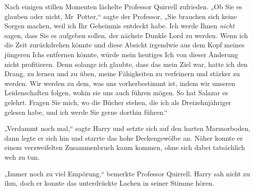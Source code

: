 Nach einigen stillen Momenten lächelte Professor Quirrell zufrieden. „Ob Sie es glauben oder nicht, Mr~Potter,“ sagte der Professor, „Sie brauchen sich keine Sorgen machen, weil ich Ihr Geheimnis entdeckt habe. Ich werde Ihnen \emph{nicht} sagen, dass Sie es aufgeben sollen, der nächste Dunkle Lord zu werden. Wenn ich die Zeit zurückdrehen könnte und diese Absicht irgendwie aus dem Kopf meines jüngeren Ichs entfernen könnte, würde mein heutiges Ich von dieser Änderung nicht profitieren. Denn solange ich glaubte, dass das mein Ziel war, hatte ich den Drang, zu lernen und zu üben, meine Fähigkeiten zu verfeinern und stärker zu werden. Wir werden zu dem, was uns vorherbestimmt ist, indem wir unseren Leidenschaften folgen, wohin sie uns auch führen mögen. So hat Salazar es gelehrt. Fragen Sie mich, wo die Bücher stehen, die ich als Dreizehnjähriger gelesen habe, und ich werde Sie gerne dorthin führen.“

„Verdammt noch mal,“ sagte Harry und setzte sich auf den harten Marmorboden, dann legte er sich hin und starrte das hohe Deckengewölbe an. Näher konnte er einem verzweifelten Zusammenbruch kaum kommen, ohne sich dabei tatsächlich weh zu tun.

„Immer noch zu viel Empörung,“ bemerkte Professor Quirrell. Harry sah nicht zu ihm, doch er konnte das unterdrückte Lachen in seiner Stimme hören.

